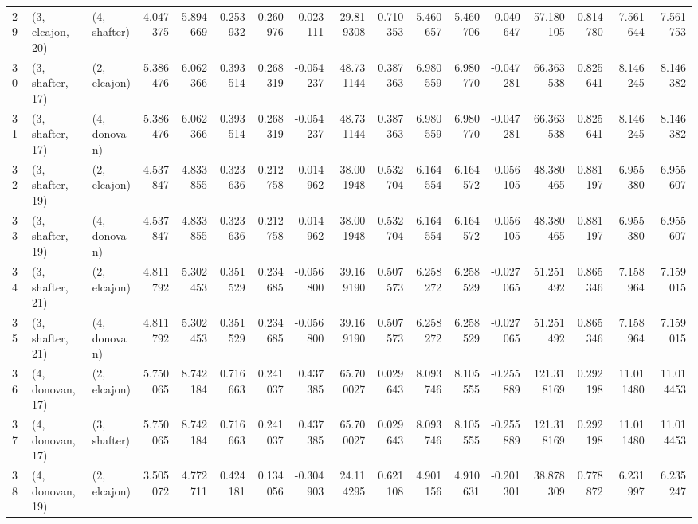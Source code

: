 \begin{tabular}{lllrrrrrrrrrrrrrr}
29 &  (3, elcajon, 20) &     (4, shafter) &  4.047375 &  5.894669 &   0.253932 &  0.260976 & -0.023111 &   29.819308 &  0.710353 &   5.460657 &   5.460706 &  0.040647 &   57.180105 &  0.814780 &   7.561644 &   7.561753 \\
30 &  (3, shafter, 17) &     (2, elcajon) &  5.386476 &  6.062366 &   0.393514 &  0.268319 & -0.054237 &   48.731144 &  0.387363 &   6.980559 &   6.980770 & -0.047281 &   66.363538 &  0.825641 &   8.146245 &   8.146382 \\
31 &  (3, shafter, 17) &     (4, donovan) &  5.386476 &  6.062366 &   0.393514 &  0.268319 & -0.054237 &   48.731144 &  0.387363 &   6.980559 &   6.980770 & -0.047281 &   66.363538 &  0.825641 &   8.146245 &   8.146382 \\
32 &  (3, shafter, 19) &     (2, elcajon) &  4.537847 &  4.833855 &   0.323636 &  0.212758 &  0.014962 &   38.001948 &  0.532704 &   6.164554 &   6.164572 &  0.056105 &   48.380465 &  0.881197 &   6.955380 &   6.955607 \\
33 &  (3, shafter, 19) &     (4, donovan) &  4.537847 &  4.833855 &   0.323636 &  0.212758 &  0.014962 &   38.001948 &  0.532704 &   6.164554 &   6.164572 &  0.056105 &   48.380465 &  0.881197 &   6.955380 &   6.955607 \\
34 &  (3, shafter, 21) &     (2, elcajon) &  4.811792 &  5.302453 &   0.351529 &  0.234685 & -0.056800 &   39.169190 &  0.507573 &   6.258272 &   6.258529 & -0.027065 &   51.251492 &  0.865346 &   7.158964 &   7.159015 \\
35 &  (3, shafter, 21) &     (4, donovan) &  4.811792 &  5.302453 &   0.351529 &  0.234685 & -0.056800 &   39.169190 &  0.507573 &   6.258272 &   6.258529 & -0.027065 &   51.251492 &  0.865346 &   7.158964 &   7.159015 \\
36 &  (4, donovan, 17) &     (2, elcajon) &  5.750065 &  8.742184 &   0.716663 &  0.241037 &  0.437385 &   65.700027 &  0.029643 &   8.093746 &   8.105555 & -0.255889 &  121.318169 &  0.292198 &  11.011480 &  11.014453 \\
37 &  (4, donovan, 17) &     (3, shafter) &  5.750065 &  8.742184 &   0.716663 &  0.241037 &  0.437385 &   65.700027 &  0.029643 &   8.093746 &   8.105555 & -0.255889 &  121.318169 &  0.292198 &  11.011480 &  11.014453 \\
38 &  (4, donovan, 19) &     (2, elcajon) &  3.505072 &  4.772711 &   0.424181 &  0.134056 & -0.304903 &   24.114295 &  0.621108 &   4.901156 &   4.910631 & -0.201301 &   38.878309 &  0.778872 &   6.231997 &   6.235247 \\

\end{tabular}
